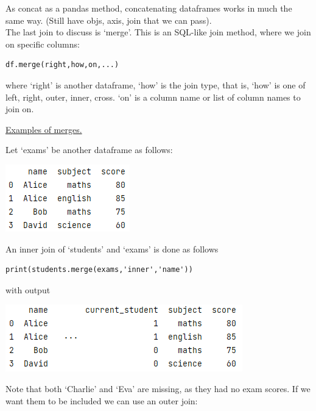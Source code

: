 \documentclass[8pt]{extarticle}
\begin{document}
\begin{multicols}{4}
As concat as a pandas method, concatenating dataframes works in much the same way. (Still have objs, axis, join that we can pass).\\

The last join to discuss is `merge'. This is an SQL-like join method, where we join on specific columns:

\begin{lstlisting}[style=Python]
df.merge(right,how,on,...)
\end{lstlisting}
where `right' is another dataframe, `how' is the join type, that is, `how' is one of left, right, outer, inner, cross. `on' is a column name or list of column names to join on.\\

\begin{center}
\underline{Examples of merges.}  
\end{center}

Let `exams' be another dataframe as follows:

\begin{center}
\includegraphics[scale = 0.6]{images/exams_df.png}
\end{center}

An inner join of `students' and `exams' is done as follows

\begin{lstlisting}[style=Python]
print(students.merge(exams,'inner','name'))
\end{lstlisting}

with output
\begin{center}
\includegraphics[scale = 0.5]{images/inner_merge.png}
\end{center}

Note that both `Charlie' and `Eva' are missing, as they had no exam scores. If we want them to be included we can use an outer join:


\end{multicols}
\end{document}
